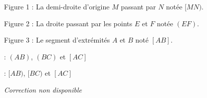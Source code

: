 \exo{}

Figure \no{}1 : La demi-droite d'origine $M$ passant par $N$ notée $[MN)$.

Figure \no{}2 : La droite passant par les points $E$ et $F$ notée $(EF)$.

Figure \no{}3 : Le segment d'extrémités $A$ et $B$ noté $[AB]$. 

\exo{}

 : $(AB)$, $(BC)$ et $[AC]$

\medskip
{} : $[AB)$, $[BC)$ et $[AC]$

\exo{}

\textit{Correction non disponible}